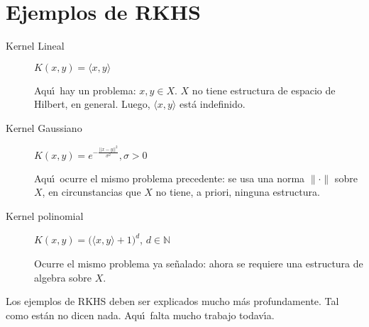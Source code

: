 \section{Ejemplos de RKHS}

\begin{description}
\item[Kernel Lineal]
$K(x,y) = \langle x,y \rangle$
\begin{myremark}
Aqu\'\i\ hay un problema: 
$x,y\in X$.
$X$ no tiene estructura de espacio de Hilbert, en general.
Luego, $\langle x,y\rangle$ est\'a indefinido.
\end{myremark}

\item[Kernel Gaussiano]
$K(x,y) = e^{-\frac{||x-y||^2}{\sigma^2}}, \sigma > 0$
\begin{myremark}
Aqu\'\i\ ocurre el mismo problema precedente: 
se usa una norma $\|\cdot\|$ sobre $X$, en circunstancias que $X$
no tiene, a priori, ninguna estructura.
\end{myremark}

\item[Kernel polinomial] 
$K(x,y) = \big( \langle x,y\rangle + 1\big)^d$, $d\in\mathbb{N}$
\begin{myremark}
Ocurre el mismo problema ya se\~nalado: ahora se requiere una estructura
de algebra sobre $X$.
\end{myremark}
\end{description}

\begin{myremark}
Los ejemplos de RKHS deben ser explicados mucho m\'as profundamente.
Tal como est\'an no dicen nada.
Aqu\'\i\ falta mucho trabajo todav\'\i a.
\end{myremark}


